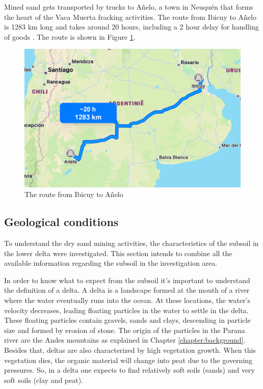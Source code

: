 Mined sand gets transported by trucks to Añelo, a town in Neuquén that forms the heart of the Vaca Muerta fracking activities. The route from Ibicuy to Añelo is 1283 km long and takes around 20 hours, including a 2 hour delay for handling of goods \autocite{secretariadepoliticamineraArenasParaFracking2019}. The route is shown in Figure \ref{fig:sandroute}. 

\begin{figure}[H]
    \centering
    \includegraphics[width=0.6\linewidth]{figures/ch9/Routesand.png}
    \caption{The route from Ibicuy to Añelo \autocite{google maps}}
    \label{fig:sandroute}
\end{figure}

\subsection{Geological conditions} \label{par:geology}
To understand the dry sand mining activities, the characteristics of the subsoil in the lower delta were investigated. This section intends to combine all the available information regarding the subsoil in the investigation area.

In order to know what to expect from the subsoil it's important to understand the definition of a delta. A delta is a landscape formed at the mouth of a river where the water eventually runs into the ocean. At these locations, the water's velocity decreases, leading floating particles in the water to settle in the delta. These floating particles contain gravels, sands and clays, descending in particle size and formed by erosion of stone. The origin of the particles in the Parana river are the Andes mountains as explained in Chapter \ref{chapter:background}. 
Besides that, deltas are also characterized by high vegetation growth. When this vegetation dies, the organic material will change into peat due to the governing pressures. So, in a delta one expects to find relatively soft soils (sands) and very soft soils (clay and peat).

